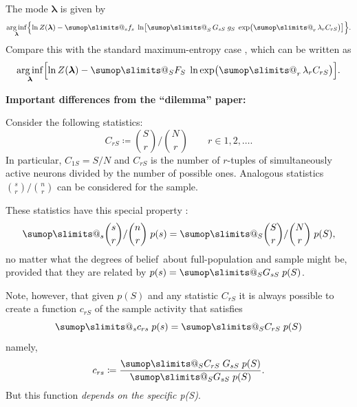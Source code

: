 \documentclass[\ifafour a4paper,12pt,\else a5paper,10pt,\fi%
onecolumn,oneside,article,%
british%
]{memoir}
\makeatletter
\theoremstyle{remark}
\theoremstyle{innote}
\def\sum{\DOTSI\sumop\slimits@}
\newcommand*{\citep}{\parencites}
\newcommand*{\defd}{\coloneqq}
\renewcommand*{\|}{\nonscript\,\vert\nonscript\;\mathopen{}}
\newcommand*{\tsum}{\mathop{\textstyle\sum}\nolimits}
\DeclareMathOperator*{\arginf}{arg\,inf}
\newcommand*{\dobs}{degrees of belief}
\newcommand*{\yS}{S}
\newcommand*{\ys}{s}
\newcommand*{\yll}{\lambda}
\newcommand*{\yl}{\bm{\lambda}}
\newcommand*{\yg}{g}
\makeatother
\begin{document}
The mode $\yl$ is given by
\begin{equation}
  \arginf_{\yl}\Bigl\{ 
  \ln Z(\yl) - \sum_{\ys} f_{\ys}\;
  \ln\bigl[\tsum_{\yS}
  G_{\ys\yS}\;\yg_{\yS}\;
  \exp\bigl( \tsum_{r} \yll_{r} C_{r\yS} \bigr)\bigr]
  \Bigr\}.
\end{equation}
Compare this with the standard maximum-entropy case \citep{meadetal1984},
which can be written as
\begin{equation}
  \arginf_{\yl}\Bigl[
  \ln Z(\yl) - \sum_{\yS} F_{\yS}\;
  \ln \exp\bigl( \tsum_{r} \yll_{r} C_{r\yS} \bigr)
  \Bigr].
\end{equation}

\bigskip

\textbf{Important differences from the \enquote{dilemma} paper:}

Consider the following statistics:
\begin{equation}
  \label{eq:statistics_factorial}
  C_{r\yS} \defd \binom{\yS}{r}/\binom{N}{r}
  \qquad r\in{1,2,\dotsc}.
\end{equation}
In particular, $C_{1\yS} = \yS/N$ and $C_{r\yS}$ is the number of
$r$-tuples of simultaneously active neurons divided by the number of
possible ones. Analogous statistics $\binom{\ys}{r}/\binom{n}{r}$ can
be considered for the sample.

These statistics have this special property
\citep{portamanaetal2015,portamanaetal2018b}:
\begin{equation}
  \label{eq:equality_statistics_sample_pop}
  \sum_{\ys} \binom{\ys}{r}/\binom{n}{r}\;p(\ys)
=   \sum_{\yS} \binom{\yS}{r}/\binom{N}{r}\;p(\yS),
\end{equation}
no matter what the \dobs\ about full-population and sample might be,
provided that they are related by $p(\ys) = \sum_{\yS}G_{\ys\yS}\;p(\yS)$.

Note, however, that given $p(\yS)$ and any statistic $C_{r\yS}$ it is
always possible to create a function $c_{r\yS}$ of the sample activity that
satisfies
\begin{equation}
  \label{eq:equality_statistics_general}
  \sum_{\ys} c_{r\ys}\;p(\ys)
  =   \sum_{\yS} C_{r\yS}\;p(\yS)
\end{equation}
namely,
\begin{equation}
  \label{eq:ad-hoc_statistics}
  c_{r\ys} \defd \frac{\sum_{\yS} C_{r\yS}\;G_{\ys\yS}\;p(\yS)}{
    \sum_{\yS}G_{\ys\yS}\;p(\yS)}.
\end{equation}
But this function \emph{depends on the specific p(\yS)}.
\end{document}
